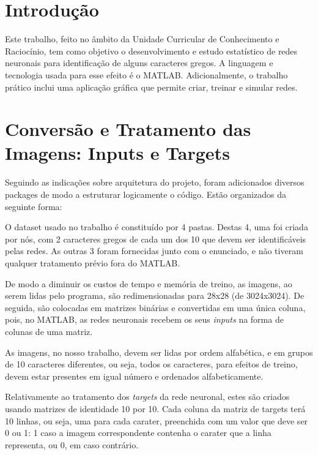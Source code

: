 \documentclass[11pt]{article}
\begin{document}
	
	
	\tableofcontents
	\pagebreak
	
	\large
	\section{Introdução}
	
	\normalsize
	Este trabalho, feito no âmbito da Unidade Curricular de Conhecimento e Raciocínio, tem como objetivo o desenvolvimento e estudo estatístico de redes neuronais para identificação de alguns caracteres gregos. A linguagem e tecnologia usada para esse efeito é o MATLAB. Adicionalmente, o trabalho prático inclui uma aplicação gráfica que permite criar, treinar e simular redes.
	
	\large
	\section{Conversão e Tratamento das Imagens: Inputs e Targets}
	\normalsize
	
	Seguindo as indicações sobre arquitetura do projeto, foram adicionados diversos packages de modo a estruturar logicamente o código. Estão organizados da seguinte forma:
	
	O dataset usado no trabalho é constituído por 4 pastas. Destas 4, uma foi criada por nós, com 2 caracteres gregos de cada um dos 10 que devem ser identificáveis pelas redes. As outras 3 foram fornecidas junto com o enunciado, e não tiveram qualquer tratamento prévio fora do MATLAB.
	
	De modo a diminuir os custos de tempo e memória de treino, as imagens, ao serem lidas pelo programa, são redimensionadas para 28x28 (de 3024x3024). De seguida, são colocadas em matrizes binárias e convertidas em uma única coluna, pois, no MATLAB, as redes neuronais recebem os seus \textit{inputs} na forma de colunas de uma matriz.
	
	As imagens, no nosso trabalho, devem ser lidas por ordem alfabética, e em grupos de 10 caracteres diferentes, ou seja, todos os caracteres, para efeitos de treino, devem estar presentes em igual número e ordenados alfabeticamente.
	
	Relativamente ao tratamento dos \textit{targets} da rede neuronal, estes são criados usando matrizes de identidade 10 por 10. Cada coluna da matriz de targets terá 10 linhas, ou seja, uma para cada carater, preenchida com um valor que deve ser 0 ou 1: 1 caso a imagem correspondente contenha o carater que a linha representa, ou 0, em caso contrário.
	
\end{document}
